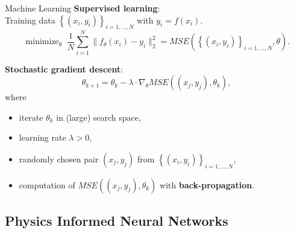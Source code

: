 \documentclass[9pt]{beamer}
\DeclareMathOperator*{\minimize}{minimize}
\begin{document}
\begin{frame}{Machine Learning}
    \textbf{Supervised learning}: \\
    Training data $\left\{ \left(x_i, y_i \right) \right\}_{i = 1, \ldots, N}$ with $y_i = f(x_i)$. \\
    \begin{equation*}
        \minimize_{\theta} \; \frac{1}{N} \sum_{i=1}^{N} \lVert f_{\theta} \left(x_{i}\right) - y_{i} \rVert^{2}_2 =  MSE \left( \left\{ \left(x_i, y_i \right) \right\}_{i = 1, \ldots, N}, \theta \right).  
    \end{equation*}

    \vspace{3mm}

    \textbf{Stochastic gradient descent}: \\
    \begin{equation*}
        \label{Gradient Descent}
        \theta_{k+1} = \theta_k - \lambda \cdot \nabla_{\theta} MSE \left( \left(x_j, y_j \right), \theta_k \right),
    \end{equation*}
    where
    \begin{itemize}
        \item iterate $\theta_k$ in (large) search space,
        \item learning rate $\lambda > 0$,
        \item randomly chosen pair $\left(x_j, y_j \right)$ from $\left\{ \left(x_i, y_i \right) \right\}_{i = 1, \ldots, N}$,
        \item computation of $MSE \left( \left(x_j, y_j \right), \theta_k \right)$ with \textbf{back-propagation}. 
    \end{itemize}
\end{frame}



\subsection{Physics Informed Neural Networks}
\end{document}
